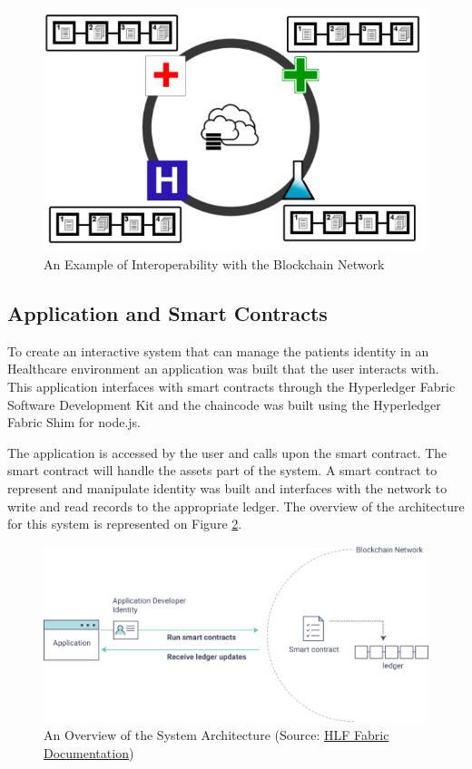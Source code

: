 \documentclass[]{llncs}
\begin{document}
\begin{figure}[ht]
\centering
\includegraphics[width=0.7\linewidth]{images/interoperability.png}
\caption{\label{fig:interoperability}An Example of Interoperability with the Blockchain Network}
\end{figure}

\subsection{Application and Smart Contracts}

To create an interactive system that can manage the patients identity in an
Healthcare environment an application was built that the user interacts with.
This application interfaces with smart contracts through the Hyperledger Fabric
Software Development Kit and the chaincode was built using the Hyperledger
Fabric Shim for node.js.

The application is accessed by the user and calls upon the smart contract.  The
smart contract will handle the assets part of the system.  A smart contract to
represent and manipulate identity was built and interfaces with the network to
write and read records to the appropriate ledger. The overview of the
architecture for this system is represented on Figure \ref{fig:appOverview}.

\begin{figure}[ht]
\centering
\includegraphics[width=1\linewidth]{images/hyperledgerAppOverview.png}
\caption{\label{fig:appOverview}An Overview of the System Architecture (Source: \href{http://hyperledger-fabric.readthedocs.io/en/latest/write_first_app.html}{HLF Fabric Documentation})}
\end{figure}
\end{document}
